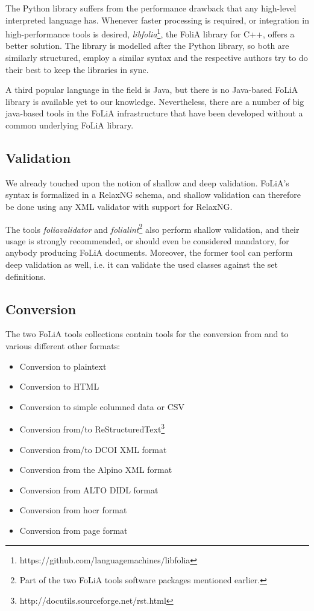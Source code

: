 \documentclass[a4paper,10pt,twoside]{article}
\begin{document}
The Python library suffers from the performance drawback that any high-level
interpreted language has. Whenever faster processing is required, or
integration in high-performance tools is desired,
\emph{libfolia}\footnote{https://github.com/languagemachines/libfolia}, the
FoliA library for C++, offers a better solution. The library is modelled after
the Python library, so both are similarly structured, employ a similar syntax
and the respective authors try to do their best to keep the libraries in sync.

A third popular language in the field is Java, but there is no Java-based FoLiA
library is available yet to our knowledge. Nevertheless, there are a number of
big java-based tools in the FoLiA infrastructure that have been developed
without a common underlying FoLiA library.

\subsection{Validation}

We already touched upon the notion of shallow and deep validation.
FoLiA's syntax is formalized in a RelaxNG schema, and shallow validation can
therefore be done using any XML validator with support for RelaxNG. 

The tools \emph{foliavalidator} and \emph{folialint}\footnote{Part of the two
FoLiA tools software packages mentioned earlier.} also perform shallow
validation, and their usage is strongly recommended, or should even be considered
mandatory, for anybody producing FoLiA documents. Moreover, the former tool can
perform deep validation as well, i.e. it can validate the used classes against
the set definitions.

\subsection{Conversion}

The two FoLiA tools collections contain tools for the conversion from and to
various different other formats:

\begin{itemize}
    \item Conversion to plaintext
    \item Conversion to HTML
    \item Conversion to simple columned data or CSV
    \item Conversion from/to ReStructuredText\footnote{http://docutils.sourceforge.net/rst.html}
    \item Conversion from/to DCOI XML format \cite{DCOI}
    \item Conversion from the Alpino XML format \cite{ALPINO}
    \item Conversion from ALTO DIDL format %
    \item Conversion from hocr format  %
    \item Conversion from page format  %
\end{itemize}
\end{document}
